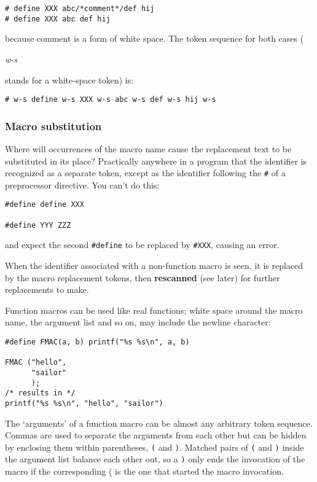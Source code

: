    \begin{Verbatim}
# define XXX abc/*comment*/def hij
# define XXX abc def hij
\end{Verbatim}

   because comment is a form of white space. The token sequence for both
    cases (\begin{center}\textit{w-s}\end{center}

 stands for a white-space token) is:


   \begin{Verbatim}
# w-s define w-s XXX w-s abc w-s def w-s hij w-s
\end{Verbatim}

   \subsubsection{Macro substitution}
    

    Where will occurrences of the macro name cause the replacement text
     to be substituted in its place? Practically anywhere in a program that
     the identifier is recognized as a separate token, except as the
     identifier following the \texttt{\#} of a preprocessor directive.
     You can't do this:


    \begin{Verbatim}
#define define XXX

#define YYY ZZZ
\end{Verbatim}

    and expect the second \texttt{\#define} to be replaced by
     \texttt{\#XXX}, causing an error.


    When the identifier associated with a non-function macro is seen, it
     is replaced by the macro replacement tokens, then \textbf{rescanned}
     (see later) for further replacements to make.


    Function macros can be used like real functions; white space around
     the macro name, the argument list and so on, may include the newline
     character:


    \begin{Verbatim}
#define FMAC(a, b) printf("%s %s\n", a, b)

FMAC ("hello",
      "sailor"
      );
/* results in */
printf("%s %s\n", "hello", "sailor")
\end{Verbatim}

    The `arguments' of a function macro can be almost any arbitrary
     token sequence. Commas are used to separate the arguments from each
     other but can be hidden by enclosing them within parentheses,
     \texttt{(} and \texttt{)}. Matched pairs of \texttt{(} and
     \texttt{)} inside the argument list balance each other out, so
     a \texttt{)} only ends the invocation of the macro if the
     corresponding ( is the one that started the macro invocation.


